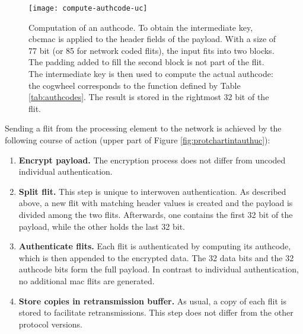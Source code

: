 \begin{figure}
    \centering
    \texttt{[image: compute-authcode-uc]}
    \caption[Computation of an authcode]{Computation of an authcode. To obtain the intermediate key, \gls{cbcmac} is
    applied to the header fields of the payload. With a size of 77 bit (or 85 for network coded flits), the input fits into two
    blocks. The padding added to fill the second block is not part of the flit. The intermediate key is then used to compute the actual authcode: the
    cogwheel corresponds to the function defined by Table \ref{tab:authcodes}. The result is stored in the rightmost 32 bit of the flit.}
    \label{fig:computeauthcodeuc}
\end{figure}

Sending a flit from the processing element to the network is achieved by the following course of action (upper part of Figure \ref{fig:protchartintauthuc}):
\begin{enumerate}
    \item \textbf{Encrypt payload.} The encryption process does not differ from uncoded individual authentication.
    \item \textbf{Split flit.} This step is unique to interwoven authentication. As described above, a new flit with matching header values is created
        and the payload is divided among the two flits. Afterwards, one contains the first 32 bit of the payload, while the other holds the last 32
        bit.
    \item \textbf{Authenticate flits.} Each flit is authenticated by computing its authcode, which is then appended to the encrypted data. The 32 data
        bits and the 32 authcode bits form the full payload. In contrast to individual authentication, no additional \gls{mac} flits are generated.
    \item \textbf{Store copies in retransmission buffer.} As usual, a copy of each flit is stored to facilitate retransmissions. This step does not
        differ from the other protocol versions.
\end{enumerate}
\vspace{0.5\baselineskip}

